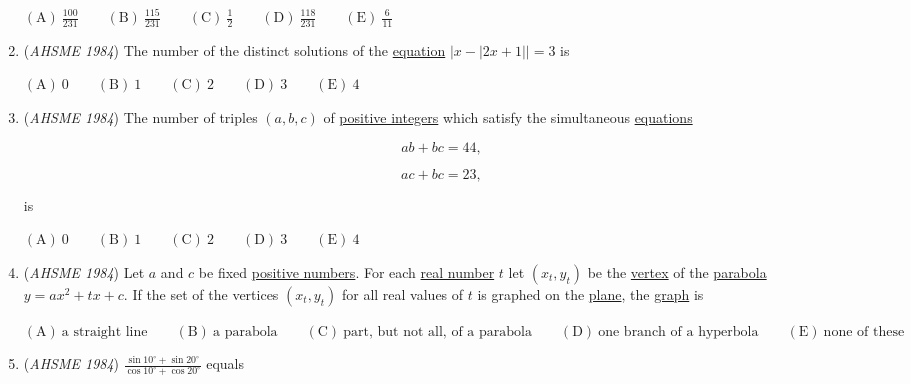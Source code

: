 \begin{enumerate}
 $\mathrm{(A) \ }\frac{100}{231} \qquad \mathrm{(B) \ }\frac{115}{231} \qquad \mathrm{(C) \ } \frac{1}{2} \qquad \mathrm{(D) \ }\frac{118}{231} \qquad \mathrm{(E) \ } \frac{6}{11}$


	\item (\textit{AHSME 1984}) The number of the distinct solutions of the \href{https://artofproblemsolving.com/wiki/index.php?title=Equation}{equation} $|{x-|2x+1|}|=3$ is


 $\mathrm{(A) \ }0 \qquad \mathrm{(B) \ }1 \qquad \mathrm{(C) \ } 2 \qquad \mathrm{(D) \ }3 \qquad \mathrm{(E) \ } 4$


	\item (\textit{AHSME 1984}) The number of triples $(a, b, c)$ of \href{https://artofproblemsolving.com/wiki/index.php?title=Natural\_numbers}{positive integers} which satisfy the simultaneous \href{https://artofproblemsolving.com/wiki/index.php?title=Equation}{equations}


 
 \[ab+bc=44,\]

 \[ac+bc=23,\]


 is


 $\mathrm{(A) \ }0 \qquad \mathrm{(B) \ }1 \qquad \mathrm{(C) \ } 2 \qquad \mathrm{(D) \ }3 \qquad \mathrm{(E) \ } 4$


	\item (\textit{AHSME 1984}) Let $a$ and $c$ be fixed \href{https://artofproblemsolving.com/wiki/index.php?title=Natural\_numbers}{positive numbers}. For each \href{https://artofproblemsolving.com/wiki/index.php?title=Real\_number}{real number} $t$ let $(x_t, y_t)$ be the \href{https://artofproblemsolving.com/wiki/index.php?title=Vertex}{vertex} of the \href{https://artofproblemsolving.com/wiki/index.php?title=Parabola}{parabola} $y=ax^2+tx+c$. If the set of the vertices $(x_t, y_t)$ for all real values of $t$ is graphed on the \href{https://artofproblemsolving.com/wiki/index.php?title=Cartesian\_plane}{plane}, the \href{https://artofproblemsolving.com/wiki/index.php?title=Graph}{graph} is


 $\mathrm{(A) \ } \text{a straight line} \qquad \mathrm{(B) \ } \text{a parabola} \qquad \mathrm{(C) \ } \text{part, but not all, of a parabola} \qquad \mathrm{(D) \ } \text{one branch of a hyperbola} \qquad \mathrm{(E) \ } \text{none of these}$


	\item (\textit{AHSME 1984}) $\frac{\sin{10^\circ}+\sin{20^\circ}}{\cos{10^\circ}+\cos{20^\circ}}$ equals



\end{enumerate}
